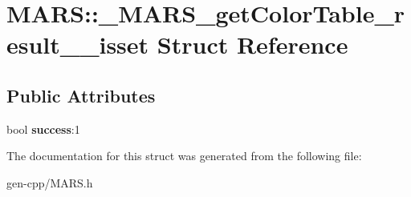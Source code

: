 \hypertarget{structMARS_1_1__MARS__getColorTable__result____isset}{}\section{M\+A\+RS\+:\+:\+\_\+\+M\+A\+R\+S\+\_\+get\+Color\+Table\+\_\+result\+\_\+\+\_\+isset Struct Reference}
\label{structMARS_1_1__MARS__getColorTable__result____isset}
\subsection*{Public Attributes}
\begin{DoxyCompactItemize}
\item 
\mbox{\label{structMARS_1_1__MARS__getColorTable__result____isset_a0450a4a0373cd04c108e7e23f57dd67b}} 
bool {\bfseries success}\+:1
\end{DoxyCompactItemize}


The documentation for this struct was generated from the following file\+:\begin{DoxyCompactItemize}
\item 
gen-\/cpp/M\+A\+R\+S.\+h\end{DoxyCompactItemize}

